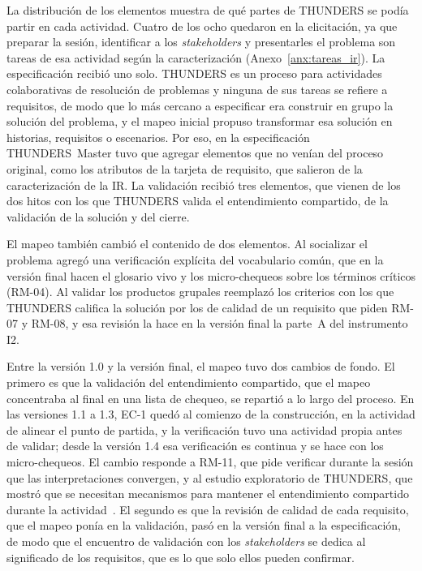 \documentclass[12pt,letterpaper,oneside]{report}
\begin{document}
La distribución de los elementos muestra de qué partes de THUNDERS se podía
partir en cada actividad. Cuatro de los ocho quedaron en la elicitación, ya que
preparar la sesión, identificar a los \textit{stakeholders} y presentarles el
problema son tareas de esa actividad según la caracterización
(Anexo~\ref{anx:tareas_ir}). La especificación recibió uno solo. THUNDERS es un
proceso para actividades colaborativas de resolución de problemas y ninguna de
sus tareas se refiere a requisitos, de modo que lo más cercano a especificar era
construir en grupo la solución del problema, y el mapeo inicial propuso transformar esa
solución en historias, requisitos o escenarios. Por eso, en la especificación
THUNDERS~Master tuvo que agregar elementos que no venían del proceso original, como
los atributos de la tarjeta de requisito, que salieron de la caracterización de
la IR. La validación recibió tres elementos, que vienen de los dos hitos con los
que THUNDERS valida el entendimiento compartido, de la validación de la solución y del
cierre.

El mapeo también cambió el contenido de dos elementos. Al socializar el problema
agregó una verificación explícita del vocabulario común, que en la versión final
hacen el glosario vivo y los micro-chequeos sobre los términos críticos
(RM-04). Al validar los productos grupales reemplazó los criterios con los que
THUNDERS califica la solución por los de calidad de un requisito que piden RM-07
y RM-08, y esa revisión la hace en la versión final la parte~A del instrumento
I2.

Entre la versión 1.0 y la versión final, el mapeo tuvo dos cambios de fondo. El
primero es que la
validación del entendimiento compartido, que el mapeo concentraba al final en una lista de
chequeo, se repartió a lo largo del proceso. En las versiones 1.1 a 1.3, EC-1
quedó al comienzo de la construcción, en la actividad de alinear el punto de
partida, y la verificación tuvo una actividad propia antes de validar; desde la
versión 1.4 esa verificación es continua y se hace con los micro-chequeos. El
cambio responde a RM-11, que pide verificar durante la sesión que las
interpretaciones convergen, y al estudio exploratorio de THUNDERS, que mostró
que se necesitan mecanismos para mantener el entendimiento compartido durante la
actividad~\cite{agredo2022exploratory}. El segundo es que la revisión de
calidad de cada requisito, que el mapeo ponía en la validación, pasó en la versión final a la
especificación, de modo que el encuentro de validación con los
\textit{stakeholders} se dedica al significado de los requisitos, que es lo que
solo ellos pueden confirmar.
\end{document}
